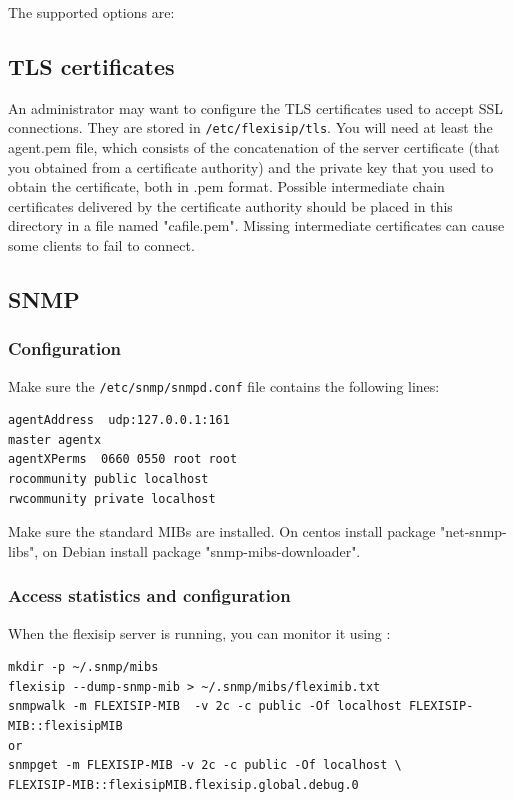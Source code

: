 \documentclass[a4paper,10pt]{article}
\begin{document}
The supported options are:





\subsection{TLS certificates}
An administrator may want to configure the TLS certificates used to accept SSL connections.
They are stored in \verb|/etc/flexisip/tls|. You will need at least the agent.pem file, which consists of the concatenation of the server certificate
(that you obtained from a certificate authority) and the private key that you used to obtain the certificate, both in .pem format. Possible intermediate chain certificates delivered by the certificate authority should be placed in this directory in a file named "cafile.pem". Missing intermediate certificates can cause some clients to fail to connect.

\subsection{SNMP}
\subsubsection{Configuration}
Make sure the \verb|/etc/snmp/snmpd.conf| file contains the following lines:
\begin{verbatim}
agentAddress  udp:127.0.0.1:161
master agentx
agentXPerms  0660 0550 root root
rocommunity public localhost
rwcommunity private localhost
\end{verbatim}

Make sure the standard MIBs are installed.
On centos install package "net-snmp-libs", on Debian install package "snmp-mibs-downloader".



\subsubsection{Access statistics and configuration}
When the flexisip server is running, you can monitor it using :
\begin{verbatim}
mkdir -p ~/.snmp/mibs
flexisip --dump-snmp-mib > ~/.snmp/mibs/fleximib.txt
snmpwalk -m FLEXISIP-MIB  -v 2c -c public -Of localhost FLEXISIP-MIB::flexisipMIB
or
snmpget -m FLEXISIP-MIB -v 2c -c public -Of localhost \
FLEXISIP-MIB::flexisipMIB.flexisip.global.debug.0
\end{verbatim}
\end{document}
